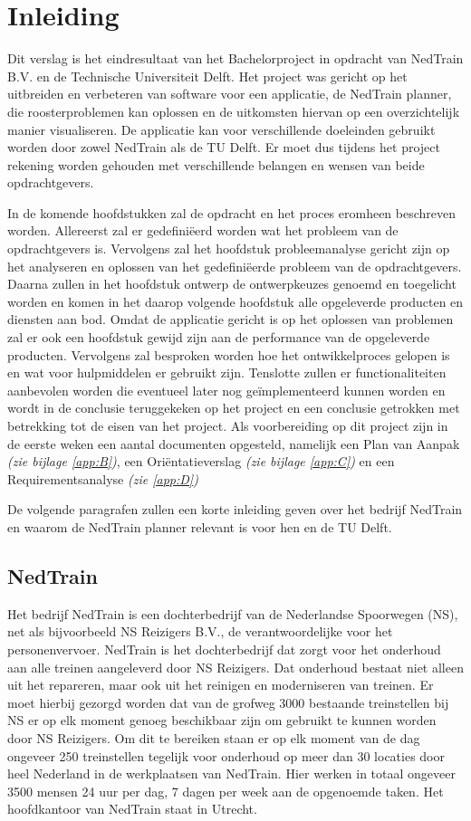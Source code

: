 \section{Inleiding}
Dit verslag is het eindresultaat van het Bachelorproject in opdracht van NedTrain B.V. en de Technische Universiteit Delft. Het project was gericht op het uitbreiden en verbeteren van software voor een applicatie, de NedTrain planner, die roosterproblemen kan oplossen en de uitkomsten hiervan op een overzichtelijk manier visualiseren. De applicatie kan voor verschillende doeleinden gebruikt worden door zowel NedTrain als de TU Delft. Er moet dus tijdens het project rekening worden gehouden met verschillende belangen en wensen van beide opdrachtgevers.

In de komende hoofdstukken zal de opdracht en het proces eromheen beschreven worden. Allereerst zal er gedefini\"eerd worden wat het probleem van de opdrachtgevers is. Vervolgens zal het hoofdstuk probleemanalyse gericht zijn op het analyseren en oplossen van het gedefini\"eerde probleem van de opdrachtgevers. Daarna zullen in het hoofdstuk ontwerp de ontwerpkeuzes genoemd en toegelicht worden en komen in het daarop volgende hoofdstuk alle opgeleverde producten en diensten aan bod. Omdat de applicatie gericht is op het oplossen van problemen zal er ook een hoofdstuk gewijd zijn aan de performance van de opgeleverde producten. Vervolgens zal besproken worden hoe het ontwikkelproces gelopen is en wat voor hulpmiddelen er gebruikt zijn. Tenslotte zullen er functionaliteiten aanbevolen worden die eventueel later nog ge\"implementeerd kunnen worden en wordt in de conclusie teruggekeken op het project en een conclusie getrokken met betrekking tot de eisen van het project. Als voorbereiding op dit project zijn in de eerste weken een aantal documenten opgesteld, namelijk een Plan van Aanpak \emph{(zie bijlage \ref{app:B})}, een Ori\"entatieverslag \emph{(zie bijlage \ref{app:C})} en een Requirementsanalyse \emph{(zie \ref{app:D})}

De volgende paragrafen zullen een korte inleiding geven over het bedrijf NedTrain en waarom de NedTrain planner relevant is voor hen en de TU Delft.

\subsection{NedTrain}
Het bedrijf NedTrain is een dochterbedrijf van de Nederlandse Spoorwegen (NS), net als bijvoorbeeld NS Reizigers B.V., de verantwoordelijke voor het personenvervoer. NedTrain is het dochterbedrijf dat zorgt voor het onderhoud aan alle treinen aangeleverd door NS Reizigers. Dat onderhoud bestaat niet alleen uit het repareren, maar ook uit het reinigen en moderniseren van treinen. Er moet hierbij gezorgd worden dat van de grofweg 3000 bestaande treinstellen bij NS er op elk moment genoeg beschikbaar zijn om gebruikt te kunnen worden door NS Reizigers. Om dit te bereiken staan er op elk moment van de dag ongeveer 250 treinstellen tegelijk voor onderhoud op meer dan 30 locaties door heel Nederland in de werkplaatsen van NedTrain. Hier werken in totaal ongeveer 3500 mensen 24 uur per dag, 7 dagen per week aan de opgenoemde taken. Het hoofdkantoor van NedTrain staat in Utrecht.

